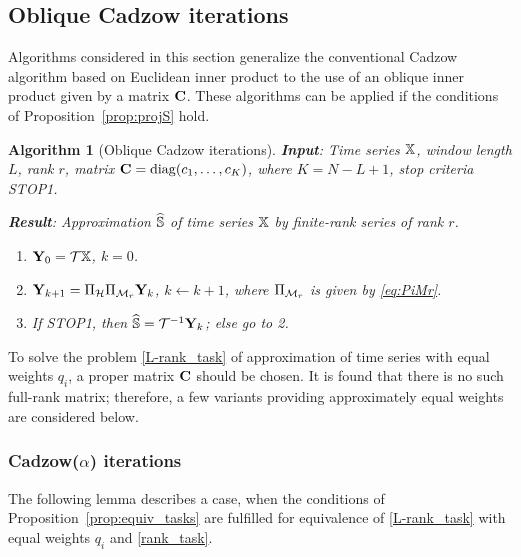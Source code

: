 \documentclass[sii]{ipart}
\newtheorem{algorithm}{Algorithm}
\newtheorem{remark}{Remark}
\begin{document}

\subsection{Oblique Cadzow iterations}
\label{sec:ObliqueCadzow}
Algorithms considered in this section generalize the conventional Cadzow algorithm based on Euclidean inner product to the use of an oblique inner product given by a matrix $\mathbf{C}$.
These algorithms can be applied if the conditions of Proposition~\ref{prop:projS} hold.

\begin{algorithm}[Oblique Cadzow iterations]
	\label{alg:obliqueCadzow}
	\textbf{Input}: Time series $\mathbb{X}$, window length $L$, rank $r$, matrix $\mathbf{C}=\mathop{\mathrm{diag}}(c_1,\ldots, c_K)$, where $K=N-L+1$,
	stop criteria STOP1.
	
	\textbf{Result}:
	Approximation $\widehat{\mathbb{S}}$ of time series $\mathbb{X}$ by finite-rank series of rank $r$.
	
	\begin{enumerate}
		\item
		$\mathbf{Y}_0 = \mathcal{T} \mathbb{X}$, $k=0$.
		\item
		$\mathbf{Y}_{k+1} = \Pi_{\mathcal{H}}  \Pi_{\mathcal{M}_r} \mathbf{Y}_{k}$, $k\leftarrow k+1$, where
		$\Pi_{\mathcal{M}_r}$ is given by \eqref{eq:PiMr}.
		\item
		If STOP1, then $\widehat{\mathbb{S}} = \mathcal{T}^{-1} \mathbf{Y}_k$; else go to 2.
	\end{enumerate}
\end{algorithm}

To solve the problem \eqref{L-rank_task} of approximation of time series with equal weights $q_i$, a proper matrix $\mathbf{C}$ should be chosen. It is found that there is no such full-rank matrix; therefore, a few variants providing approximately equal weights are considered below.

\subsubsection{Cadzow($\alpha$) iterations}
\label{sec:cadzow_alpha}
The following lemma describes a case, when the conditions of Proposition~\ref{prop:equiv_tasks} are fulfilled for equivalence of \eqref{L-rank_task} with equal weights $q_i$ and \eqref{rank_task}.
\end{document}
